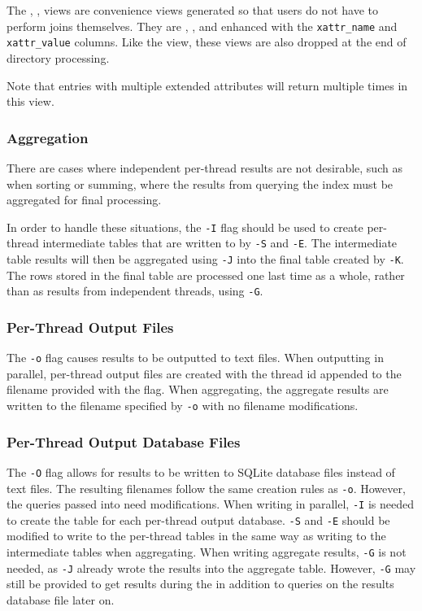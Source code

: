 The \xentries, \xpentries, \xsummary views are convenience views
generated so that users do not have to perform joins themselves. They
are \entries, \pentries, and \summary enhanced with the
\texttt{xattr\_name} and \texttt{xattr\_value} columns. Like the
\xattrs view, these views are also dropped at the end of directory
processing.

Note that entries with multiple extended attributes will return
multiple times in this view.

\subsubsection{Aggregation}
There are cases where independent per-thread results are not
desirable, such as when sorting or summing, where the results from
querying the index must be aggregated for final processing.

In order to handle these situations, the \texttt{-I} flag should be
used to create per-thread intermediate tables that are written to by
\texttt{-S} and \texttt{-E}. The intermediate table results will then
be aggregated using \texttt{-J} into the final table created by
\texttt{-K}. The rows stored in the final table are processed one last
time as a whole, rather than as results from independent threads,
using \texttt{-G}.

\subsubsection{Per-Thread Output Files}
The \texttt{-o} flag causes results to be outputted to text
files. When outputting in parallel, per-thread output files are
created with the thread id appended to the filename provided with the
flag. When aggregating, the aggregate results are written to the
filename specified by \texttt{-o} with no filename modifications.

\subsubsection{Per-Thread Output Database Files}
The \texttt{-O} flag allows for results to be written to SQLite
database files instead of text files. The resulting filenames follow
the same creation rules as \texttt{-o}. However, the queries passed
into \gufiquery need modifications. When writing in parallel,
\texttt{-I} is needed to create the table for each per-thread output
database. \texttt{-S} and \texttt{-E} should be modified to write to
the per-thread tables in the same way as writing to the intermediate
tables when aggregating. When writing aggregate results, \texttt{-G}
is not needed, as \texttt{-J} already wrote the results into the
aggregate table. However, \texttt{-G} may still be provided to get
results during the \gufiquery in addition to queries on the results
database file later on.

